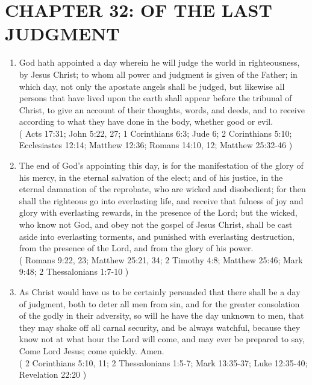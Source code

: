 \documentclass[12pt,a4paper]{book}
\begin{document}
\chapter{CHAPTER 32: OF THE LAST JUDGMENT}
\label{ch-las-jud}
\begin{enumerate}
\item God hath appointed a day wherein he will judge the world in righteousness, by Jesus Christ; to whom all power and judgment is given of the Father; in which day, not only the apostate angels shall be judged, but likewise all persons that have lived upon the earth shall appear before the tribunal of Christ, to give an account of their thoughts, words, and deeds, and to receive according to what they have done in the body, whether good or evil.\\
( Acts 17:31; John 5:22, 27; 1 Corinthians 6:3; Jude 6; 2 Corinthians 5:10; Ecclesiastes 12:14; Matthew 12:36; Romans 14:10, 12; Matthew 25:32-46 )
\item The end of God's appointing this day, is for the manifestation of the glory of his mercy, in the eternal salvation of the elect; and of his justice, in the eternal damnation of the reprobate, who are wicked and disobedient; for then shall the righteous go into everlasting life, and receive that fulness of joy and glory with everlasting rewards, in the presence of the Lord; but the wicked, who know not God, and obey not the gospel of Jesus Christ, shall be cast aside into everlasting torments, and punished with everlasting destruction, from the presence of the Lord, and from the glory of his power.\\
( Romans 9:22, 23; Matthew 25:21, 34; 2 Timothy 4:8; Matthew 25:46; Mark 9:48; 2 Thessalonians 1:7-10 )
\item As Christ would have us to be certainly persuaded that there shall be a day of judgment, both to deter all men from sin, and for the greater consolation of the godly in their adversity, so will he have the day unknown to men, that they may shake off all carnal security, and be always watchful, because they know not at what hour the Lord will come, and may ever be prepared to say, Come Lord Jesus; come quickly. Amen.\\
( 2 Corinthians 5:10, 11; 2 Thessalonians 1:5-7; Mark 13:35-37; Luke 12:35-40; Revelation 22:20 )
\end{enumerate}
\end{document}
